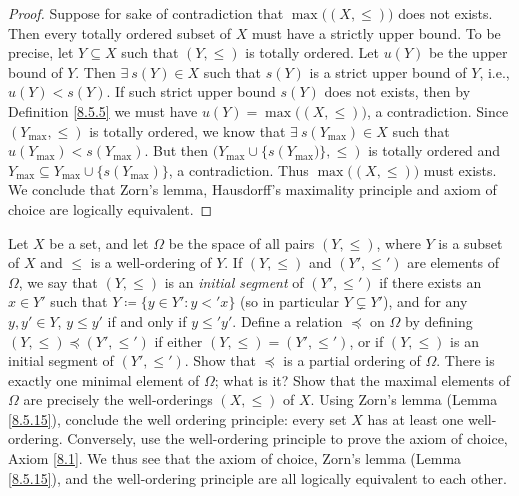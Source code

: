 \begin{proof}
    Suppose for sake of contradiction that \(\max\big((X, \leq)\big)\) does not exists.
    Then every totally ordered subset of \(X\) must have a strictly upper bound.
    To be precise, let \(Y \subseteq X\) such that \((Y, \leq)\) is totally ordered.
    Let \(u(Y)\) be the upper bound of \(Y\).
    Then \(\exists\ s(Y) \in X\) such that \(s(Y)\) is a strict upper bound of \(Y\), i.e., \(u(Y) < s(Y)\).
    If such strict upper bound \(s(Y)\) does not exists, then by Definition \ref{8.5.5} we must have \(u(Y) = \max\big((X, \leq)\big)\), a contradiction.
    Since \((Y_{\max}, \leq)\) is totally ordered, we know that \(\exists\ s(Y_{\max}) \in X\) such that \(u(Y_{\max}) < s(Y_{\max})\).
    But then \(\big(Y_{\max} \cup \{s(Y_{\max}\big)\}, \leq)\) is totally ordered and \(Y_{\max} \subseteq Y_{\max} \cup \{s(Y_{\max})\}\), a contradiction.
    Thus \(\max\big((X, \leq)\big)\) must exists.
    We conclude that Zorn's lemma, Hausdorff's maximality principle and axiom of choice are logically equivalent.
\end{proof}

\begin{exercise}\label{ex 8.5.19}
    Let \(X\) be a set, and let \(\Omega\) be the space of all pairs \((Y, \leq)\), where \(Y\) is a subset of \(X\) and \(\leq\) is a well-ordering of \(Y\).
    If \((Y, \leq)\) and \((Y', \leq')\) are elements of \(\Omega\), we say that \((Y, \leq)\) is an \emph{initial segment} of \((Y', \leq')\) if there exists an \(x \in Y'\) such that \(Y \coloneqq \{y \in Y' : y <' x\}\) (so in particular \(Y \subsetneq Y'\)), and for any \(y, y' \in Y\), \(y \leq y'\) if and only if \(y \leq' y'\).
    Define a relation \(\preceq\) on \(\Omega\) by defining \((Y, \leq) \preceq (Y', \leq')\) if either \((Y, \leq) = (Y', \leq')\), or if \((Y, \leq)\) is an initial segment of \((Y', \leq')\).
    Show that \(\preceq\) is a partial ordering of \(\Omega\).
    There is exactly one minimal element of \(\Omega\);
    what is it?
    Show that the maximal elements of \(\Omega\) are precisely the well-orderings \((X, \leq)\) of \(X\).
    Using Zorn's lemma (Lemma \ref{8.5.15}), conclude the well ordering principle:
    every set \(X\) has at least one well-ordering.
    Conversely, use the well-ordering principle to prove the axiom of choice, Axiom \ref{8.1}.
    We thus see that the axiom of choice, Zorn's lemma (Lemma \ref{8.5.15}), and the well-ordering principle are all logically equivalent to each other.
\end{exercise}

